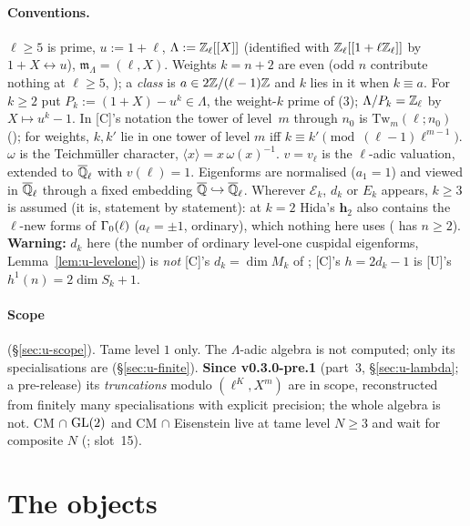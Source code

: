 \documentclass[11pt]{article}
\newcommand{\Iw}{\Lambda}                         %
\newcommand{\hcusp}{\mathbf{h}}                   %
\newcommand{\Pk}[1]{P_{#1}}                       %
\newcommand{\Ek}{\mathcal{E}}                     %
\newcommand{\Qlb}{\overline{\Q}_\ell}
\newcommand{\Zl}{\Z_\ell}
\begin{document}
\paragraph{Conventions.} $\ell\ge5$ is prime, $u:=1+\ell$, $\Iw:=\Zl[[X]]$ (identified with $\Zl[[1+\ell\Zl]]$ by
$1+X\leftrightarrow u$), $\mathfrak m_\Iw=(\ell,X)$. Weights $k=n+2$ are even (odd $n$ contribute nothing at
$\ell\ge5$, ); a \emph{class} is $a\in2\mathbb{Z}/(\ell-1)\mathbb{Z}$ and $k$ lies in it when $k\equiv a$. For $k\ge2$
put $\Pk{k}:=(1+X)-u^{k}\in\Iw$, the weight-$k$ prime of (3); $\Iw/\Pk{k}=\Zl$ by $X\mapsto u^{k}-1$.
In [C]'s notation the tower of level~$m$ through $n_0$ is $\mathrm{Tw}_m(\ell;n_0)$ (); for weights,
$k,k'$ lie in one tower of level $m$ iff $k\equiv k'\pmod{(\ell-1)\ell^{m-1}}$. $\omega$ is the Teichmüller character,
$\langle x\rangle=x\,\omega(x)^{-1}$. $v=v_\ell$ is the $\ell$-adic valuation, extended to $\Qlb$ with $v(\ell)=1$.
Eigenforms are normalised ($a_1=1$) and viewed in $\Qlb$ through a fixed embedding $\overline{\Q}\hookrightarrow\Qlb$.
Wherever $\Ek_k$, $d_k$ or $E_k$ appears, $k\ge3$ is assumed (it is, statement by statement): at $k=2$ Hida's $\hcusp_2$ also contains the
$\ell$-new forms of $\Gamma_0(\ell)$ ($a_\ell=\pm1$, ordinary), which nothing here uses ( has $n\ge2$). \textbf{Warning:} $d_k$ here
(the number of ordinary level-one cuspidal eigenforms, Lemma~\ref{lem:u-levelone}) is \emph{not} [C]'s $d_k=\dim M_k$ of ;
[C]'s $h=2d_k-1$ is [U]'s $h^{1}(n)=2\dim S_k+1$.

\paragraph{Scope} (\S\ref{sec:u-scope}). Tame level $1$ only. The $\Iw$-adic algebra is not computed; only its
specialisations are (\S\ref{sec:u-finite}). \textbf{Since v0.3.0-pre.1} (part~3, \S\ref{sec:u-lambda}; a pre-release) its \emph{truncations} modulo
$(\ell^{K},X^{m})$ are in scope, reconstructed from finitely many specialisations with explicit precision; the whole algebra is not. CM $\cap$ $\mathrm{GL}(2)$ and CM $\cap$ Eisenstein live at
tame level $N\ge3$ and wait for composite $N$ (; slot~15).

\section{The objects}\label{sec:u-setting}
\end{document}
